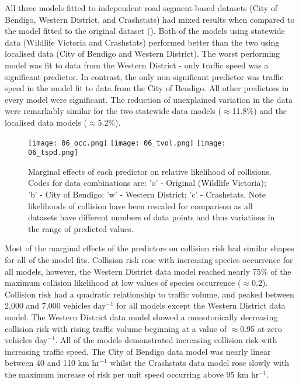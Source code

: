 All three models fitted to independent road segment-based datasets (City of Bendigo, Western District, and Crashstats) had mixed results when compared to the model fitted to the original dataset (). Both of the models using statewide data (Wildlife Victoria and Crashstats) performed better than the two using localised data (City of Bendigo and Western District). The worst performing model was fit to data from the Western District - only traffic speed was a significant predictor. In contrast, the only non-significant predictor was traffic speed in the model fit to data from the City of Bendigo. All other predictors in every model were significant. The reduction of unexplained variation in the data were remarkably similar for the two statewide data models ($\approx$11.8\%) and the localised data models ($\approx$5.2\%).

\begin{figure*}[htp]
  \centering
  \texttt{[image: 06\_occ.png]}
  \texttt{[image: 06\_tvol.png]}
  \texttt{[image: 06\_tspd.png]}
  \caption[Marginal effects of predictor variables on relative likelihood of collision using independent datasets to train models]{Marginal effects of each predictor on relative likelihood of collisions. Codes for data combinations are: 'o' - Original (Wildlife Victoria); 'b' - City of Bendigo; 'w' - Western District; 'c' - Crashstats. Note likelihoods of collision have been rescaled for comparison as all datasets have different numbers of data points and thus variations in the range of predicted values.}
  \label{val_effects}
\end{figure*}

Most of the marginal effects of the predictors on collision risk had similar shapes for all of the model fits. Collision risk rose with increasing species occurrence for all models, however, the Western District data model reached nearly 75\% of the maximum collision likelihood at low values of species occurrence ($\approx$0.2). Collision risk had a quadratic relationship to traffic volume, and peaked between 2,000 and 7,000 vehicles day$^{-1}$ for all models except the Western District data model. The Western District data model showed a monotonically decreasing collision risk with rising traffic volume beginning at a value of $\approx$0.95 at zero vehicles day$^{-1}$. All of the models demonstrated increasing collision risk with increasing traffic speed. The City of Bendigo data model was nearly linear between 40 and 110 km hr$^{-1}$ whilst the Crashstats data model rose slowly with the maximum increase of risk per unit speed occurring above 95 km hr$^{-1}$.

